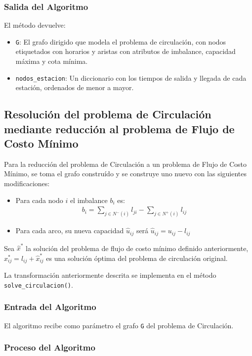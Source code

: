 \documentclass{article}
\begin{document}
\subsubsection*{Salida del Algoritmo}

El método devuelve:
\begin{itemize}
    \item \texttt{G}: El grafo dirigido que modela el problema de circulación, con nodos etiquetados con horarios y aristas con atributos de imbalance, capacidad máxima y cota mínima.
    \item \texttt{nodos\_estacion}: Un diccionario con los tiempos de salida y llegada de cada estación, ordenados de menor a mayor.
\end{itemize}

\subsection*{Resolución del problema de Circulación mediante reducción al problema de Flujo de Costo Mínimo}
Para la reducción del problema de Circulación a un problema de Flujo de Costo Mínimo, se toma el grafo construído y se construye uno nuevo con las siguientes modificaciones:
\begin{itemize}
    \item Para cada nodo $i$ el imbalance $b_i$ es:
$$
\begin{aligned}
b_i = \sum_{j \in N^-(i)} l_{ji} - \sum_{j \in N^+(i)} l_{ij}
\end{aligned}
$$
    \item Para cada arco, su nueva capacidad $\hat{u}_{ij}$ será $\hat{u}_{ij} = u_{ij} - l_{ij}$
\end{itemize}

Sea $\hat{x}^*$ la solución del problema de flujo de costo mínimo definido anteriormente,  $x^*_{ij} = l_{ij} + \hat{x}^*_{ij}$ es una solución óptima del problema de circulación original.

La transformación anteriormente descrita se implementa en el método \texttt{solve\_circulacion()}. 

\subsubsection*{Entrada del Algoritmo}
El algoritmo recibe como parámetro el grafo \texttt{G} del problema de Circulación.

\subsubsection*{Proceso del Algoritmo}
\end{document}
